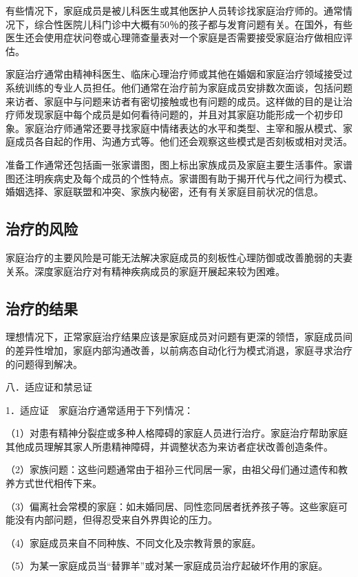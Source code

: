 有些情况下，家庭成员是被儿科医生或其他医护人员转诊找家庭治疗师的。通常情况下，综合性医院儿科门诊中大概有50％的孩子都与发育问题有关。在国外，有些医生还会使用症状问卷或心理筛查量表对一个家庭是否需要接受家庭治疗做相应评估。

家庭治疗通常由精神科医生、临床心理治疗师或其他在婚姻和家庭治疗领域接受过系统训练的专业人员担任。他们通常在治疗前为家庭成员安排数次面谈，包括问题来访者、家庭中与问题来访者有密切接触或也有问题的成员。这样做的目的是让治疗师发现家庭中每个成员是如何看待问题的，并且对其家庭功能形成一个初步印象。家庭治疗师通常还要寻找家庭中情绪表达的水平和类型、主宰和服从模式、家庭成员各自起的作用、沟通方式等。他们还会观察这些模式是否刻板或相对灵活。

准备工作通常还包括画一张家谱图，图上标出家族成员及家庭主要生活事件。家谱图还注明疾病史及每个成员的个性特点。家谱图有助于揭开代与代之间行为模式、婚姻选择、家庭联盟和冲突、家族内秘密，还有有关家庭目前状况的信息。

\subsection{治疗的风险}

家庭治疗的主要风险是可能无法解决家庭成员的刻板性心理防御或改善脆弱的夫妻关系。深度家庭治疗对有精神疾病成员的家庭开展起来较为困难。

\subsection{治疗的结果}

理想情况下，正常家庭治疗结果应该是家庭成员对问题有更深的领悟，家庭成员间的差异性增加，家庭内部沟通改善，以前病态自动化行为模式消退，家庭寻求治疗的问题得到解决。

八．适应证和禁忌证

1．适应证　家庭治疗通常适用于下列情况：

（1）对患有精神分裂症或多种人格障碍的家庭人员进行治疗。家庭治疗帮助家庭其他成员理解其家人所患精神障碍，并调整状态为来访者症状改善创造条件。

（2）家族问题：这些问题通常由于祖孙三代同居一家，由祖父母们通过遗传和教养方式世代相传下来。

（3）偏离社会常模的家庭：如未婚同居、同性恋同居者抚养孩子等。这些家庭可能没有内部问题，但得忍受来自外界舆论的压力。

（4）家庭成员来自不同种族、不同文化及宗教背景的家庭。

（5）为某一家庭成员当“替罪羊”或对某一家庭成员治疗起破坏作用的家庭。

